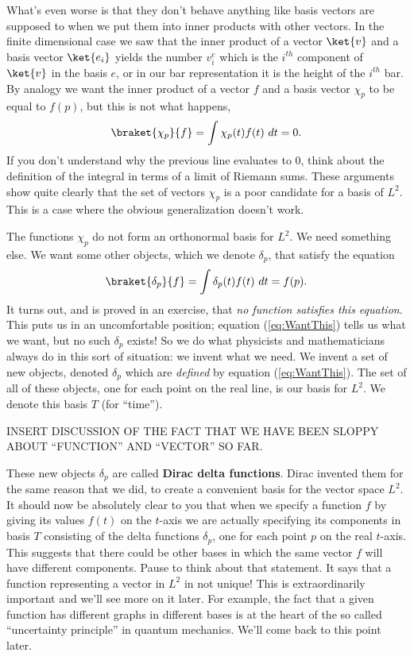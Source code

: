 What's even worse is that they don't behave anything like basis vectors are supposed to when we put them into inner products with other vectors.  In the finite dimensional case we saw that the inner product of a vector $\ket{v}$ and a basis vector $\ket{e_i}$ yields the number $v_i^e$ which is the $i^{th}$ component of $\ket{v}$ in the basis $e$, or in our bar representation it is the height of the $i^{th}$ bar.  By analogy we want the inner product of a vector $f$ and a basis vector $\chi _{p}$ to be equal to $f(p)$, but this is not what happens,
\begin{displaymath} \braket{\chi _{p}}{f} = \int \chi _{p}(t) f(t) ~dt = 0. \end{displaymath}
If you don't understand why the previous line evaluates to 0, think about the definition of the integral in terms of a limit of Riemann sums.  These arguments show quite clearly that the set of vectors $\chi _{p}$ is a poor candidate for a basis of $L^2$.  This is a case where the obvious generalization doesn't work.

The functions $\chi _{p}$ do not form an orthonormal basis for $L^2$.  We need something else.  We want some other objects, which we denote $\delta_{p}$, that satisfy the equation
\begin{equation}\label{eq:WantThis} \braket{\delta_{p}}{f} = \int \delta_{p}(t)f(t)~dt = f(p). \end{equation}
It turns out, and is proved in an exercise, that \emph{no function satisfies this equation}.  This puts us in an uncomfortable position; equation (\ref{eq:WantThis}) tells us what we want, but no such $\delta_{p}$ exists!  So we do what physicists and mathematicians always do in this sort of situation: we invent what we need.  We invent a set of new objects, denoted $\delta _{p}$ which are \emph{defined} by equation (\ref{eq:WantThis}).  The set of all of these objects, one for each point on the real line, is our basis for $L^2$.  We denote this basis $T$ (for ``time'').

INSERT DISCUSSION OF THE FACT THAT WE HAVE BEEN SLOPPY ABOUT ``FUNCTION'' AND ``VECTOR'' SO FAR.

These new objects $\delta_p$ are called \textbf{Dirac delta functions}.  Dirac invented them for the same reason that we did, to create a convenient basis for the vector space $L^2$.  It should now be absolutely clear to you that when we specify a function $f$ by giving its values $f(t)$ on the $t$-axis we are actually specifying its components in basis $T$ consisting of the delta functions $\delta_p$, one for each point $p$ on the real $t$-axis.  This suggests that there could be other bases in which the same vector $f$ will have different components.  Pause to think about that statement.  It says that a function representing a vector in $L^2$ in not unique!  This is extraordinarily important and we'll see more on it later.  For example, the fact that a given function has different graphs in different bases is at the heart of the so called ``uncertainty principle'' in quantum mechanics.  We'll come back to this point later. 

